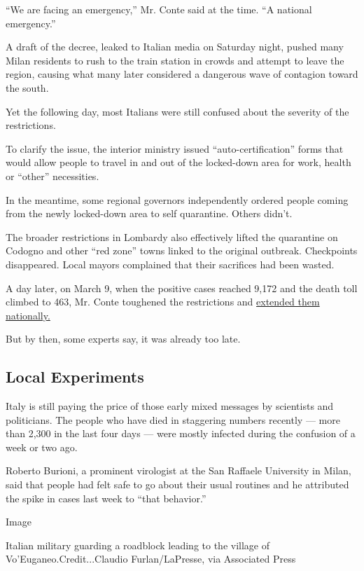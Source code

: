 ``We are facing an emergency,'' Mr. Conte said at the time. ``A national
emergency.''

A draft of the decree, leaked to Italian media on Saturday night, pushed
many Milan residents to rush to the train station in crowds and attempt
to leave the region, causing what many later considered a dangerous wave
of contagion toward the south.

Yet the following day, most Italians were still confused about the
severity of the restrictions.

To clarify the issue, the interior ministry issued
``auto-certification'' forms that would allow people to travel in and
out of the locked-down area for work, health or ``other'' necessities.

In the meantime, some regional governors independently ordered people
coming from the newly locked-down area to self quarantine. Others
didn't.

The broader restrictions in Lombardy also effectively lifted the
quarantine on Codogno and other ``red zone'' towns linked to the
original outbreak. Checkpoints disappeared. Local mayors complained that
their sacrifices had been wasted.

A day later, on March 9, when the positive cases reached 9,172 and the
death toll climbed to 463, Mr. Conte toughened the restrictions and
\href{https://www.nytimes3xbfgragh.onion/2020/03/09/world/europe/italy-lockdown-coronavirus.html?action=click\&module=RelatedLinks\&pgtype=Article}{extended
them nationally.}

But by then, some experts say, it was already too late.

\hypertarget{local-experiments}{%
\subsection{Local Experiments}\label{local-experiments}}

Italy is still paying the price of those early mixed messages by
scientists and politicians. The people who have died in staggering
numbers recently --- more than 2,300 in the last four days --- were
mostly infected during the confusion of a week or two ago.

Roberto Burioni, a prominent virologist at the San Raffaele University
in Milan, said that people had felt safe to go about their usual
routines and he attributed the spike in cases last week to ``that
behavior.''

Image

Italian military guarding a roadblock leading to the village of
Vo'Euganeo.Credit...Claudio Furlan/LaPresse, via Associated Press

